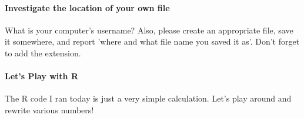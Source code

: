 \documentclass{ltjsbook}
\begin{document}
\paragraph{Investigate the location of your own file}
What is your computer's username? Also, please create an appropriate file, save it somewhere, and report 'where and what file name you saved it as'. Don't forget to add the extension.
\paragraph{Let's Play with R}
The R code I ran today is just a very simple calculation. Let's play around and rewrite various numbers!
\end{document}
